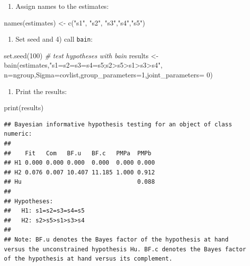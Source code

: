 \documentclass[
]{book}
\newenvironment{Shaded}{\begin{snugshade}}{\end{snugshade}}
\newcommand{\AttributeTok}[1]{\textcolor[rgb]{0.77,0.63,0.00}{#1}}
\newcommand{\CommentTok}[1]{\textcolor[rgb]{0.56,0.35,0.01}{\textit{#1}}}
\newcommand{\DecValTok}[1]{\textcolor[rgb]{0.00,0.00,0.81}{#1}}
\newcommand{\FunctionTok}[1]{\textcolor[rgb]{0.00,0.00,0.00}{#1}}
\newcommand{\NormalTok}[1]{#1}
\newcommand{\OtherTok}[1]{\textcolor[rgb]{0.56,0.35,0.01}{#1}}
\newcommand{\StringTok}[1]{\textcolor[rgb]{0.31,0.60,0.02}{#1}}
\providecommand{\tightlist}{%
  \setlength{\itemsep}{0pt}\setlength{\parskip}{0pt}}
\begin{document}
\begin{enumerate}
\def\labelenumi{\arabic{enumi})}
\setcounter{enumi}{1}
\tightlist
\item
  Assign names to the estimates:
\end{enumerate}

\begin{Shaded}
\begin{Highlighting}[]
\FunctionTok{names}\NormalTok{(estimates) }\OtherTok{\textless{}{-}} \FunctionTok{c}\NormalTok{(}\StringTok{"s1"}\NormalTok{, }\StringTok{"s2"}\NormalTok{, }\StringTok{"s3"}\NormalTok{,}\StringTok{"s4"}\NormalTok{,}\StringTok{"s5"}\NormalTok{)}
\end{Highlighting}
\end{Shaded}

\begin{enumerate}
\def\labelenumi{\arabic{enumi})}
\setcounter{enumi}{2}
\tightlist
\item
  Set seed and 4) call \texttt{bain}:
\end{enumerate}

\begin{Shaded}
\begin{Highlighting}[]
\FunctionTok{set.seed}\NormalTok{(}\DecValTok{100}\NormalTok{)}
\CommentTok{\# test hypotheses with bain}
\NormalTok{results }\OtherTok{\textless{}{-}} \FunctionTok{bain}\NormalTok{(estimates,}\StringTok{"s1=s2=s3=s4=s5;s2\textgreater{}s5\textgreater{}s1\textgreater{}s3\textgreater{}s4"}\NormalTok{,}
\AttributeTok{n=}\NormalTok{ngroup,}\AttributeTok{Sigma=}\NormalTok{covlist,}\AttributeTok{group\_parameters=}\DecValTok{1}\NormalTok{,}\AttributeTok{joint\_parameters=} \DecValTok{0}\NormalTok{)}
\end{Highlighting}
\end{Shaded}

\begin{enumerate}
\def\labelenumi{\arabic{enumi})}
\setcounter{enumi}{4}
\tightlist
\item
  Print the results:
\end{enumerate}

\begin{Shaded}
\begin{Highlighting}[]
\FunctionTok{print}\NormalTok{(results)}
\end{Highlighting}
\end{Shaded}

\begin{verbatim}
## Bayesian informative hypothesis testing for an object of class numeric:
## 
##    Fit   Com   BF.u   BF.c   PMPa  PMPb 
## H1 0.000 0.000 0.000  0.000  0.000 0.000
## H2 0.076 0.007 10.407 11.185 1.000 0.912
## Hu                                 0.088
## 
## Hypotheses:
##   H1: s1=s2=s3=s4=s5
##   H2: s2>s5>s1>s3>s4
## 
## Note: BF.u denotes the Bayes factor of the hypothesis at hand versus the unconstrained hypothesis Hu. BF.c denotes the Bayes factor of the hypothesis at hand versus its complement.
\end{verbatim}
\end{document}
